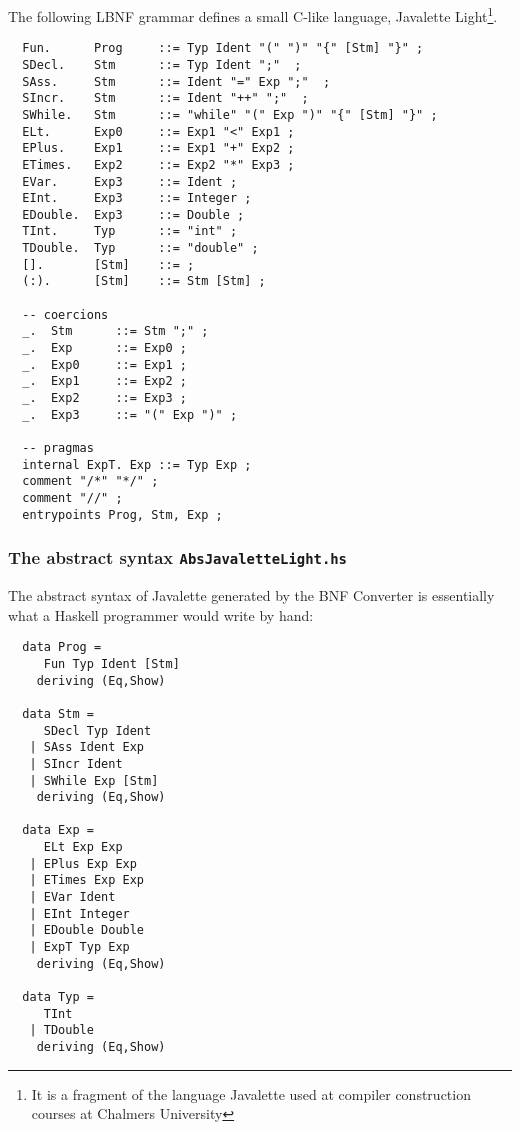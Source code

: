 \documentclass[10pt]{article}
\begin{document}
The following LBNF grammar defines a small C-like language,
Javalette Light\footnote{It is a fragment of the
language Javalette used at compiler construction courses at Chalmers University}.
\small
\begin{verbatim}
  Fun.      Prog     ::= Typ Ident "(" ")" "{" [Stm] "}" ;
  SDecl.    Stm      ::= Typ Ident ";"  ;
  SAss.     Stm      ::= Ident "=" Exp ";"  ;
  SIncr.    Stm      ::= Ident "++" ";"  ;
  SWhile.   Stm      ::= "while" "(" Exp ")" "{" [Stm] "}" ;
  ELt.      Exp0     ::= Exp1 "<" Exp1 ;
  EPlus.    Exp1     ::= Exp1 "+" Exp2 ;
  ETimes.   Exp2     ::= Exp2 "*" Exp3 ;
  EVar.     Exp3     ::= Ident ;
  EInt.     Exp3     ::= Integer ;
  EDouble.  Exp3     ::= Double ;
  TInt.     Typ      ::= "int" ;
  TDouble.  Typ      ::= "double" ;
  [].       [Stm]    ::= ;
  (:).      [Stm]    ::= Stm [Stm] ;

  -- coercions
  _.  Stm      ::= Stm ";" ;
  _.  Exp      ::= Exp0 ;
  _.  Exp0     ::= Exp1 ;
  _.  Exp1     ::= Exp2 ;
  _.  Exp2     ::= Exp3 ;
  _.  Exp3     ::= "(" Exp ")" ;

  -- pragmas
  internal ExpT. Exp ::= Typ Exp ;
  comment "/*" "*/" ;
  comment "//" ;
  entrypoints Prog, Stm, Exp ;
\end{verbatim}

\normalsize


\subsubsection{The abstract syntax {\tt AbsJavaletteLight.hs}}

The abstract syntax of Javalette generated by the
BNF Converter is essentially what a Haskell programmer would write by hand:
\small
\begin{verbatim}
  data Prog =
     Fun Typ Ident [Stm]
    deriving (Eq,Show)

  data Stm =
     SDecl Typ Ident
   | SAss Ident Exp
   | SIncr Ident
   | SWhile Exp [Stm]
    deriving (Eq,Show)

  data Exp =
     ELt Exp Exp
   | EPlus Exp Exp
   | ETimes Exp Exp
   | EVar Ident
   | EInt Integer
   | EDouble Double
   | ExpT Typ Exp
    deriving (Eq,Show)

  data Typ =
     TInt
   | TDouble
    deriving (Eq,Show)
\end{verbatim}
\normalsize
\end{document}
